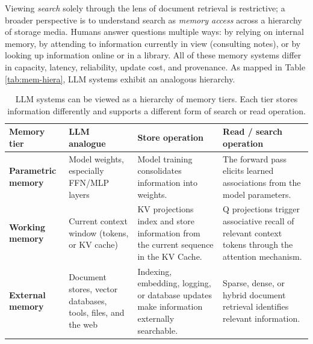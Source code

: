 Viewing \emph{search} solely through the lens of document retrieval is restrictive; a broader perspective is to understand search as \emph{memory access} across a hierarchy of storage media. Humans answer questions multiple ways: by relying on internal memory, by attending to information currently in view (consulting notes), or by looking up information online or in a library. All of these memory systems differ in capacity, latency, reliability, update cost, and provenance. As mapped in Table \ref{tab:mem-hiera}, LLM systems exhibit an analogous hierarchy.




\begin{table}[t]
\centering
\small
\renewcommand{\arraystretch}{1.25}
\setlength{\tabcolsep}{7pt}

\caption{LLM systems can be viewed as a hierarchy of memory tiers. Each tier stores information differently and supports a different form of search or read operation.}
\label{tab:mem-hiera}
\label{tab:memory-hierarchy}

\begin{tabularx}{1.3\textwidth}{>{\bfseries}p{} Y Y Y}
\toprule
{}
Memory tier & LLM analogue & Store operation & Read / search operation \\
\midrule

Parametric memory
&
Model weights, especially FFN/MLP layers
&
Model training consolidates information into weights.
&
The forward pass elicits learned associations from the model parameters.
\\

Working memory
&
Current context window (tokens, or KV cache)
&
KV projections index and store information from the current sequence in the KV Cache.
&
Q projections trigger associative recall of relevant context tokens through the attention mechanism.
\\

External memory
&
Document stores, vector databases, tools, files, and the web
&
Indexing, embedding, logging, or database updates make information externally searchable.
&
Sparse, dense, or hybrid document retrieval identifies relevant information.
\\

\bottomrule
\end{tabularx}
\end{table}


